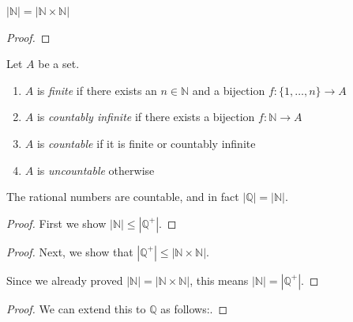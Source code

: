 \documentclass [aspectratio=169]{beamer}
\newcommand{\N}{{\mathbb{N}}}
\newcommand{\Q}{{\mathbb{Q}}}
\begin{document}
\begin{frame}
\begin{example}
$|\N| = |\N \times \N|$
\end{example}
\begin{proof}
\vspace{5cm}
\end{proof}
\end{frame}

\begin{frame}
\begin{definition}
Let $A$ be a set. 
\begin{enumerate}
\item $A$ is \emph{finite} if there exists an $n \in \N$ and a bijection $f:\{1,\ldots,n\} \to A$
\item $A$ is \emph{countably infinite} if there exists a bijection $f:\N\to A$
\item $A$ is \emph{countable} if it is finite or countably infinite
\item $A$ is \emph{uncountable} otherwise
\end{enumerate}
\end{definition}
\end{frame}

\begin{frame}
\begin{example}
The rational numbers are countable, and in fact $|\Q| = |\N|$.
\end{example}

\begin{proof}
First we show $|\N| \leq |\Q^+|$.
\vspace{4.5cm}
\end{proof}
\end{frame}

\begin{frame}
\begin{proof}
Next, we show that $|\Q^+| \leq |\N \times \N|$.

\vspace{5cm}

Since we already proved $|\N| = |\N \times \N|$, this means $|\N| = |\Q^+|$.
\end{proof}

\end{frame}

\begin{frame}
\begin{proof}
We can extend this to $\Q$ as follows:.
\vspace{5cm}
\end{proof}

\end{frame}
\end{document}
